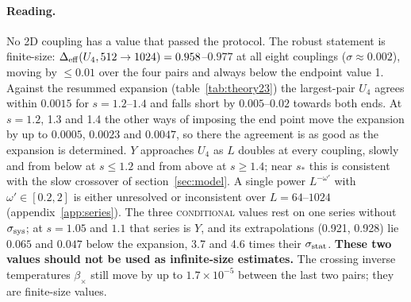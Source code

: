 \documentclass[10pt,a4paper]{article}
\newcommand{\Deff}{\Delta_{\rm eff}}
\newcommand{\lbl}[1]{{\mdseries\scshape #1}}
\newcommand{\sstat}{\sigma_{\rm stat}}
\newcommand{\ssys}{\sigma_{\rm sys}}
\begin{document}
\paragraph{Reading.} No 2D coupling has a value that passed the protocol. The robust statement is finite-size: $\Deff(U_4,512\to1024)=0.958$--$0.977$
at all eight couplings ($\sigma\approx0.002$), moving by $\le0.01$ over the four pairs and always below the endpoint value 1. Against the
resummed expansion (table~\ref{tab:theory23}) the largest-pair $U_4$ agrees within $0.0015$ for $s=1.2$--$1.4$ and falls short by $0.005$--$0.02$
towards both ends. At $s=1.2$, 1.3 and 1.4 the other ways of imposing the end point move the expansion by up to $0.0005$, $0.0023$ and $0.0047$,
so there the agreement is as good as the expansion is determined. $Y$ approaches $U_4$ as $L$ doubles at every coupling, slowly and from below at $s\le1.2$ and from above at $s\ge1.4$; near $s_*$ this is
consistent with the slow crossover of section~\ref{sec:model}. A single power $L^{-\omega'}$ with $\omega'\in[0.2,2]$ is either unresolved or inconsistent over $L=64$--$1024$
(appendix~\ref{app:series}). The three \lbl{conditional} values rest on one series without $\ssys$; at $s=1.05$ and $1.1$ that series is $Y$, and
its extrapolations (0.921, 0.928) lie $0.065$ and $0.047$ below the expansion, 3.7 and 4.6 times their $\sstat$. \textbf{These two values should
not be used as infinite-size estimates.} The crossing inverse temperatures $\beta_\times$ still move by up to $1.7\times10^{-5}$ between the last two
pairs; they are finite-size values.

\end{document}
